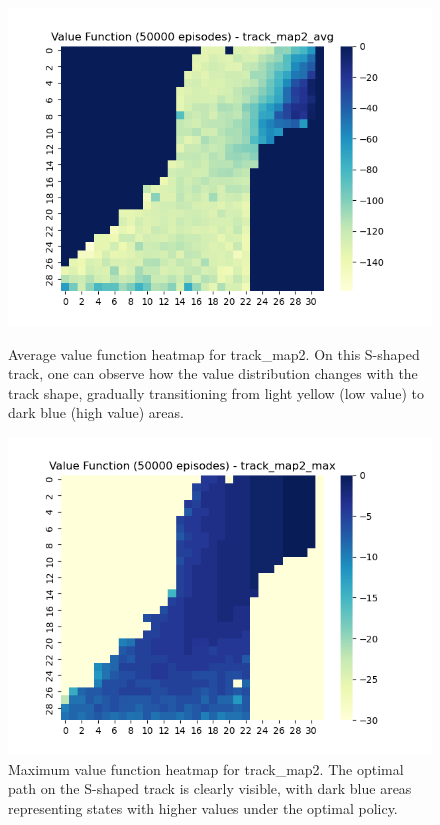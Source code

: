 \documentclass{article}
\begin{document}
\begin{figure}[H]
    \centering
    \begin{minipage}{0.48\textwidth}
        \includegraphics[width=\textwidth]{grid2_1.png}
        \caption{Average value function heatmap for track\_map2. On this S-shaped track, one can observe how the value distribution changes with the track shape, gradually transitioning from light yellow (low value) to dark blue (high value) areas.}
    \end{minipage}
    \hfill
    \begin{minipage}{0.48\textwidth}
        \includegraphics[width=\textwidth]{grid2_2.png}
        \caption{Maximum value function heatmap for track\_map2. The optimal path on the S-shaped track is clearly visible, with dark blue areas representing states with higher values under the optimal policy.}
    \end{minipage}
\end{figure}
\end{document}
